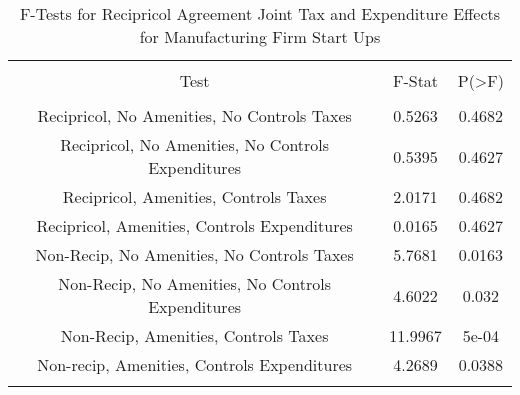 
\begin{table}[!htbp] \centering 
  \caption{F-Tests for Recipricol Agreement Joint Tax and Expenditure Effects for Manufacturing Firm Start Ups} 
  \label{31-33Ftests} 
\begin{tabular}{@{\extracolsep{5pt}} ccc} 
\\[-1.8ex]\hline 
\hline \\[-1.8ex] 
Test & F-Stat & P(\textgreater F) \\ 
\hline \\[-1.8ex] 
Recipricol, No Amenities, No Controls Taxes & 0.5263 & 0.4682 \\ 
Recipricol, No Amenities, No Controls Expenditures & 0.5395 & 0.4627 \\ 
Recipricol, Amenities, Controls Taxes & 2.0171 & 0.4682 \\ 
Recipricol, Amenities, Controls Expenditures & 0.0165 & 0.4627 \\ 
Non-Recip, No Amenities, No Controls Taxes & 5.7681 & 0.0163 \\ 
Non-Recip, No Amenities, No Controls Expenditures & 4.6022 & 0.032 \\ 
Non-Recip, Amenities, Controls Taxes & 11.9967 & 5e-04 \\ 
Non-recip, Amenities, Controls Expenditures & 4.2689 & 0.0388 \\ 
\hline \\[-1.8ex] 
\end{tabular} 
\end{table} 
